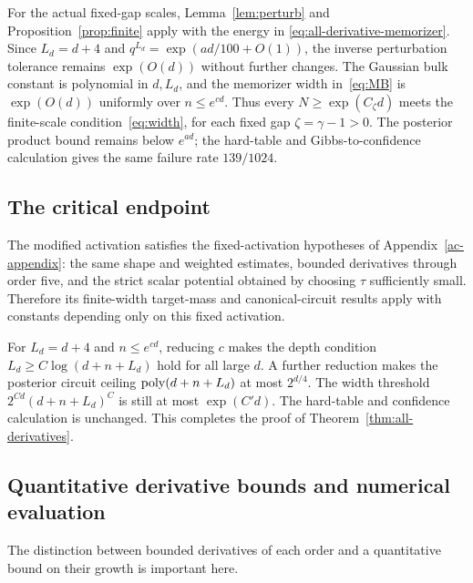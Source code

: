 For the actual fixed-gap scales, Lemma~\ref{lem:perturb} and
Proposition~\ref{prop:finite} apply with the energy in
\eqref{eq:all-derivative-memorizer}. Since $L_d=d+4$ and
$q^{L_d}=\exp(ad/100+O(1))$, the inverse perturbation tolerance
remains $\exp(O(d))$ without further changes. The Gaussian bulk
constant is polynomial in $d,L_d$, and the memorizer width
in~\eqref{eq:MB} is $\exp(O(d))$ uniformly over $n\le e^{cd}$.
Thus every $N\ge\exp(C_\zeta d)$ meets the finite-scale
condition~\eqref{eq:width}, for each fixed gap $\zeta=\gamma-1>0$.
The posterior product bound remains below $e^{ad}$; the hard-table
and Gibbs-to-confidence calculation gives the same failure rate
$139/1024$.

\subsection{The critical endpoint}

The modified activation satisfies the fixed-activation hypotheses
of Appendix~\ref{ac-appendix}: the same shape and weighted estimates,
bounded derivatives through order five, and the strict scalar
potential obtained by choosing $\tau$ sufficiently small. Therefore
its finite-width target-mass and canonical-circuit results apply
with constants depending only on this fixed activation.

For $L_d=d+4$ and $n\le e^{cd}$, reducing $c$ makes the depth
condition $L_d\ge C\log(d+n+L_d)$ hold for all large $d$.
A further reduction makes the posterior circuit ceiling
$\operatorname{poly}(d+n+L_d)$ at most
$2^{d/4}$. The width threshold
$2^{Cd}(d+n+L_d)^C$ is still at most $\exp(C'd)$.
The hard-table and confidence calculation is unchanged. This
completes the proof of Theorem~\ref{thm:all-derivatives}.

\subsection{Quantitative derivative bounds and numerical evaluation}

The distinction between bounded derivatives of each order and a
quantitative bound on their growth is important here.

